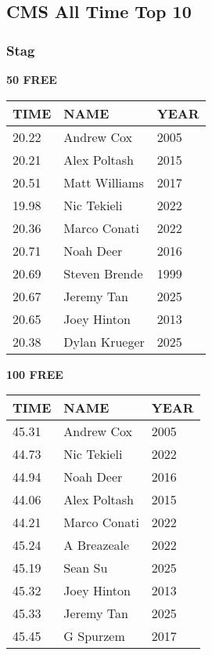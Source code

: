 
\newpage

\subsection{CMS All Time Top 10}
\subsubsection{Stag}

\begin{table}[H]
\centering
\begin{minipage}[t]{0.48\textwidth}
\centering
\textbf{50 FREE}\\[0.1cm]
\begin{tabular}{@{}p{1.8cm}p{2.8cm}p{1.2cm}@{}}
\hline
    \textbf{TIME} & \textbf{NAME} & \textbf{YEAR} \\
\hline
    20.22 & Andrew Cox & 2005 \\
    20.21 & Alex Poltash & 2015 \\
    20.51 & Matt Williams & 2017 \\
    19.98 & Nic Tekieli & 2022 \\
    20.36 & Marco Conati & 2022 \\
    20.71 & Noah Deer & 2016 \\
    20.69 & Steven Brende & 1999 \\
    20.67 & Jeremy Tan & 2025 \\
    20.65 & Joey Hinton & 2013 \\
    20.38 & Dylan Krueger & 2025 \\
\hline
\end{tabular}
\end{minipage}\hfill
\begin{minipage}[t]{0.48\textwidth}
\centering
\textbf{100 FREE}\\[0.1cm]
\begin{tabular}{@{}p{1.8cm}p{2.8cm}p{1.2cm}@{}}
\hline
    \textbf{TIME} & \textbf{NAME} & \textbf{YEAR} \\
\hline
    45.31 & Andrew Cox & 2005 \\
    44.73 & Nic Tekieli & 2022 \\
    44.94 & Noah Deer & 2016 \\
    44.06 & Alex Poltash & 2015 \\
    44.21 & Marco Conati & 2022 \\
    45.24 & A Breazeale & 2022 \\
    45.19 & Sean Su & 2025 \\
    45.32 & Joey Hinton & 2013 \\
    45.33 & Jeremy Tan & 2025 \\
    45.45 & G Spurzem & 2017 \\
\hline
\end{tabular}
\end{minipage}
\end{table}

